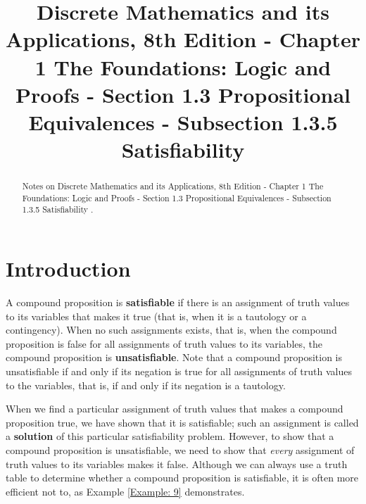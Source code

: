 \documentclass{Axon}
\title{Discrete Mathematics and its Applications, 8th Edition - Chapter 1 The Foundations: Logic and Proofs - Section 1.3 Propositional Equivalences - Subsection 1.3.5 Satisfiability}
\begin{document}
\maketitle
\makeauthor
\begin{abstract}
Notes on Discrete Mathematics and its Applications, 8th Edition - Chapter 1 The Foundations: Logic and Proofs - Section 1.3 Propositional Equivalences - Subsection 1.3.5 Satisfiability \cite{Rosen}.
\end{abstract}
\section{Introduction}
A compound proposition is \textbf{satisfiable} if there is an assignment of truth values to its variables that makes it true (that is, when it is a tautology or a contingency). When no such assignments exists, that is, when the compound proposition is false for all assignments of truth values to its variables, the compound proposition is \textbf{unsatisfiable}. Note that a compound proposition is unsatisfiable if and only if its negation is true for all assignments of truth values to the variables, that is, if and only if its negation is a tautology.

When we find a particular assignment of truth values that makes a compound proposition true, we have shown that it is satisfiable; such an assignment is called a \textbf{solution} of this particular satisfiability problem. However, to show that a compound proposition is unsatisfiable, we need to show that \textit{every} assignment of truth values to its variables makes it false. Although we can always use a truth table to determine whether a compound proposition is satisfiable, it is often more efficient not to, as Example \ref{Example: 9} demonstrates.
\end{document}
